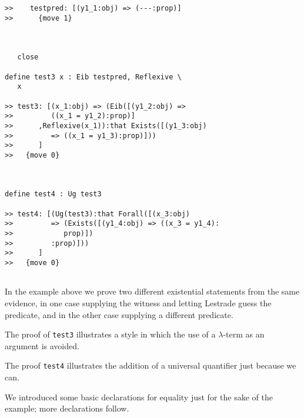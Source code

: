 \documentclass{article}
\begin{document}
\begin{verbatim}
>>    testpred: [(y1_1:obj) => (---:prop)]
>>      {move 1}



   close

define test3 x : Eib testpred, Reflexive \
   x

>> test3: [(x_1:obj) => (Eib([(y1_2:obj) =>
>>         ((x_1 = y1_2):prop)]
>>      ,Reflexive(x_1)):that Exists([(y1_3:obj)
>>         => ((x_1 = y1_3):prop)]))
>>      ]
>>   {move 0}



define test4 : Ug test3

>> test4: [(Ug(test3):that Forall([(x_3:obj)
>>         => (Exists([(y1_4:obj) => ((x_3 = y1_4):
>>            prop)])
>>         :prop)]))
>>      ]
>>   {move 0}


\end{verbatim}

In the example above we prove two different existential statements from the same evidence, in one case supplying the witness
and letting Lestrade guess the predicate, and in the other case supplying a different predicate.

The proof of {\tt test3} illustrates a style in which the use of a $\lambda$-term as an argument is avoided.

The proof {\tt test4} illustrates the addition of a universal quantifier just because we can.


We introduced some basic declarations for equality just for the sake of the example;  more declarations follow.
\end{document}
